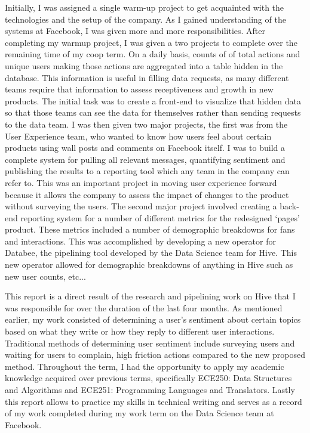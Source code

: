 Initially, I was assigned a single warm-up project to get acquainted with the technologies and the setup of the company. As I gained understanding of the systems at Facebook, I was given more and more responsibilities.  After completing my warmup project, I was given a two projects to complete over the remaining time of my coop term.  On a daily basis, counts of of total actions and unique users making those actions are aggregated into a table hidden in the database.  This information is useful in filling data requests, as many different teams require that information to assess receptiveness and growth in new products. The initial task was to create a front-end to visualize that hidden data so that those teams can see the data for themselves rather than sending requests to the data team.  I was then given two major projects, the first was from the User Experience team, who wanted to know how users feel about certain products using wall posts and comments on Facebook itself.  I was to build a complete system for pulling all relevant messages, quantifying sentiment and publishing the results to a reporting tool which any team in the company can refer to. This was an important project in moving user experience forward because it allows the company to assess the impact of changes to the product without surveying the users. The second major project involved creating a back-end reporting system for a number of different metrics for the redesigned `pages' product.  These metrics included a number of demographic breakdowns for fans and interactions.  This was accomplished by developing a new operator for Databee, the pipelining tool developed by the Data Science team for Hive. This new operator allowed for demographic breakdowns of anything in Hive such as new user counts, etc...\newline

This report is a direct result of the research and pipelining work on Hive that I was responsible for over the duration of the last four months.  As mentioned earlier, my work consisted of determining a user's sentiment about certain topics based on what they write or how they reply to different user interactions. Traditional methods of determining user sentiment include surveying users and waiting for users to complain, high friction actions compared to the new proposed method. Throughout the term, I had the opportunity to apply my academic knowledge acquired over previous terms, specifically ECE250: Data Structures and Algorithms and ECE251: Programming Languages and Translators.  Lastly this report allows to practice my skills in technical writing and serves as a record of my work completed during my work term on the Data Science team at Facebook.\newline

